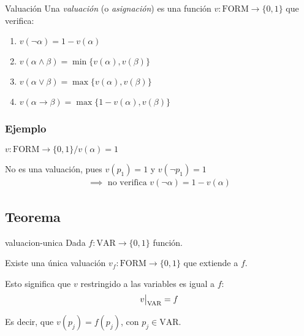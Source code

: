 \begin{definicion}{Valuación}{}
    Una \textit{valuación} (o \textit{asignación}) es una función 
    $v: \mathrm{FORM} \to \{ 0,1 \}$ que verifica:

    \begin{enumerate}[label=\protect\circled{\arabic*}]
        \item {}%
            $v (\neg \alpha) = 1 - v (\alpha)$
        \item {}%
            $v(\alpha \wedge \beta) = \min \{ v(\alpha), v(\beta) \}$
        \item {}%
            $v(\alpha \vee \beta) 
            = \max \{ v(\alpha), v(\beta) \}$
        \item {}%
            $v (\alpha \to \beta) 
            = \max\{ 1-v(\alpha), v(\beta) \}$
    \end{enumerate}
\end{definicion}

\subsubsection{Ejemplo}
$v: \mathrm{FORM} \to \{ 0,1 \} / v(\alpha) = 1$ 

No es una valuación, pues $v(p_1)=1$ y $v(\neg p_1) = 1$
\begin{gather*}
    \implies \text{ no verifica } v(\neg \alpha)=1-v(\alpha)
\end{gather*}

\subsection{Teorema}

\begin{teorema}{}{valuacion-unica}
    Dada $f: \mathrm{VAR}\to \{ 0,1 \}$ función.

    \medskip

    Existe una única valuación
    $v_f: \mathrm{FORM} \to \{ 0,1 \}$ que extiende a $f$.
\end{teorema}

Esto significa que $v$ restringido a las variables es igual a $f$:
\begin{gather*}
    \frest{v}{\mathrm{VAR}} = f
\end{gather*}

Es decir, que $v(p_j) = f(p_j)$, con $p_j \in \mathrm{VAR}$.


